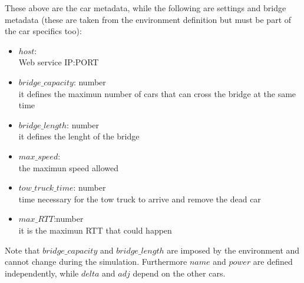 These above are the car metadata, while the following are settings and bridge metadata 
(these are taken from the environment definition but must be part of the car specifics too):
\begin{itemize}
    \item $host$:\\ Web service IP:PORT
    \item $bridge\_capacity$: number\\ it defines the maximun number of cars that can cross the bridge
    at the same time
    \item $bridge\_length$: number\\ it defines the lenght of the bridge
    \item $max\_speed$:\\ the maximun speed allowed
    \item $tow\_truck\_time$: number\\ time necessary for the tow truck to arrive and remove the dead car
    \item $max\_RTT$:number\\ it is the maximun RTT that could happen
\end{itemize}

Note that $bridge\_capacity$ and $bridge\_length$ are imposed by the environment and cannot change during the
simulation. Furthermore $name$ and $power$ are defined independently, while $delta$ and $adj$ 
depend on the other cars.\\

